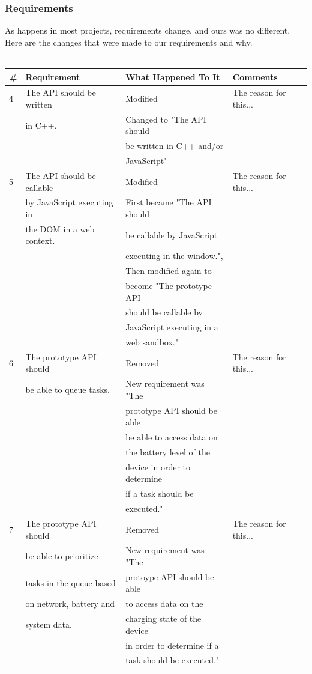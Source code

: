 \documentclass[12pt]{article}
\begin{document}
\subsubsection{Requirements}
As happens in most projects, requirements change, and ours was no different. Here are the changes that were made to our requirements and why.\\\\
\begin{tabular}{|l|l|l|l|}
\hline
\#  & Requirement 				& What Happened To It 		  & Comments \\ \hline
4	& The API should be written & Modified 					  & The reason for this... \\
	& in C++.					& Changed to "The API should  & \\
	&							& be written in C++ and/or	  & \\
	&							& JavaScript" 				  & \\ \hline
5 	& The API should be callable& Modified 					  & The reason for this... \\
	& by JavaScript executing in& First became "The API should& \\
	& the DOM in a web context. & be callable by JavaScript   & \\
	&							& executing in the window.",  & \\
	&							& Then modified again to 	  & \\
	&							& become "The prototype API   & \\
	&							& should be callable by 	  & \\
	&							& JavaScript executing in a   & \\
	&							& web sandbox." 			  & \\ \hline
6 	& The prototype API should  & Removed 				 	  & The reason for this... \\
	& be able to queue tasks. 	& New requirement was "The 	  & \\
	& 						 	& prototype API should be able& \\
	&							& be able to access data on   & \\
	&							& the battery level of the    & \\
	&							& device in order to determine& \\
	&							& if a task should be 		  & \\
	&							& executed." 				  & \\ \hline
7 	& The prototype API should  & Removed				 	  & The reason for this... \\
	& be able to prioritize		& New requirement was "The 	  & \\
	& tasks in the queue based	& protoype API should be able & \\
	& on network, battery and 	& to access data on the 	  & \\
	& system data.				& charging state of the device& \\
	&							& in order to determine if a  & \\
	&							& task should be executed."   & \\ \hline
\end{tabular}
\pagebreak
\end{document}
